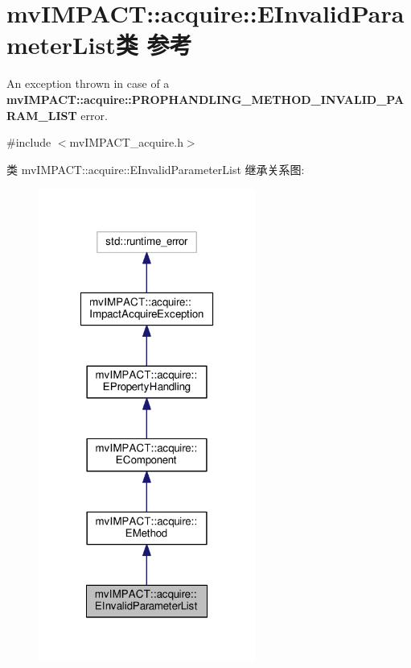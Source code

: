 \hypertarget{classmv_i_m_p_a_c_t_1_1acquire_1_1_e_invalid_parameter_list}{\section{mv\+I\+M\+P\+A\+C\+T\+:\+:acquire\+:\+:E\+Invalid\+Parameter\+List类 参考}
\label{classmv_i_m_p_a_c_t_1_1acquire_1_1_e_invalid_parameter_list}
}


An exception thrown in case of a {\bfseries mv\+I\+M\+P\+A\+C\+T\+::acquire\+::\+P\+R\+O\+P\+H\+A\+N\+D\+L\+I\+N\+G\+\_\+\+M\+E\+T\+H\+O\+D\+\_\+\+I\+N\+V\+A\+L\+I\+D\+\_\+\+P\+A\+R\+A\+M\+\_\+\+L\+I\+S\+T} error.  




{\ttfamily \#include $<$mv\+I\+M\+P\+A\+C\+T\+\_\+acquire.\+h$>$}



类 mv\+I\+M\+P\+A\+C\+T\+:\+:acquire\+:\+:E\+Invalid\+Parameter\+List 继承关系图\+:
\nopagebreak
\begin{figure}[H]
\begin{center}
\leavevmode
\includegraphics[width=202pt]{classmv_i_m_p_a_c_t_1_1acquire_1_1_e_invalid_parameter_list__inherit__graph}
\end{center}
\end{figure}


